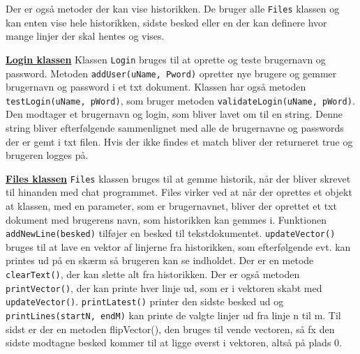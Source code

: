 Der er også metoder der kan vise historikken. De bruger alle \texttt{Files} klassen og kan enten vise hele historikken, sidste besked eller en der kan definere hvor mange linjer der skal hentes og vises.

\hfill \break
\underline{\textbf{Login klassen}}
\newline
Klassen \texttt{Login} bruges til at oprette og teste brugernavn og password. Metoden \texttt{addUser(uName, Pword)} opretter nye brugere og gemmer brugernavn og password i et txt dokument.
\newline
Klassen har også metoden \texttt{testLogin(uName, pWord)}, som bruger metoden \texttt{validateLogin(uName, pWord)}. Den modtager et brugernavn og login, som bliver lavet om til en string. Denne string bliver efterfølgende sammenlignet med alle de brugernavne og passwords der er gemt i txt filen. Hvis der ikke findes et match bliver der returneret true og brugeren logges på.

\hfill \break
\underline{\textbf{Files klassen}}
\newline
\texttt{Files} klassen bruges til at gemme historik, når der bliver skrevet til hinanden med chat programmet. Files virker ved at når der oprettes et objekt at klassen, med en parameter, som er brugernavnet, bliver der oprettet et txt dokument med brugerens navn, som historikken kan gemmes i.
\newline
Funktionen \texttt{addNewLine(besked)} tilføjer en besked til tekstdokumentet. \texttt{updateVector()} bruges til at lave en vektor af linjerne fra historikken, som efterfølgende evt. kan printes ud på en skærm så brugeren kan se indholdet. Der er en metode \texttt{clearText()}, der kan slette alt fra historikken. Der er også metoden \texttt{printVector()}, der kan printe hver linje ud, som er i vektoren skabt med \texttt{updateVector()}. \texttt{printLatest()} printer den sidste besked ud og \texttt{printLines(startN, endM)} kan printe de valgte linjer ud fra linje n til m. Til sidst er der en metoden flipVector(), den bruges til vende vectoren, så fx den sidste modtagne besked kommer til at ligge øverst i vektoren, altså på plads 0.

